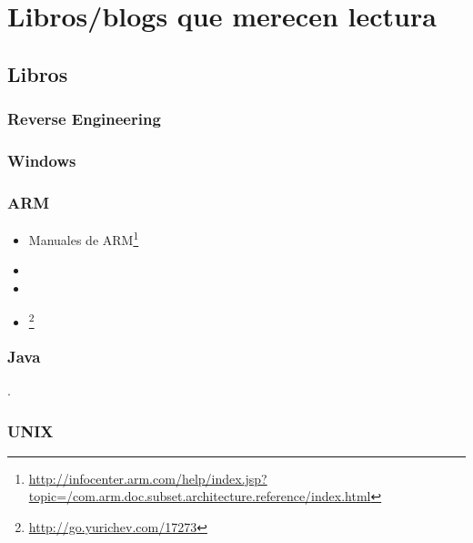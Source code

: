 \part{Libros/blogs que merecen lectura}

\chapter{Libros}

\section{Reverse Engineering}



\section{Windows}



\section{\CCpp}



\section{ARM}

\begin{itemize}
\item Manuales de ARM\footnote{\AlsoAvailableAs \url{http://infocenter.arm.com/help/index.jsp?topic=/com.arm.doc.subset.architecture.reference/index.html}}

\item \ARMSevenRef

\item \ARMSixFourRefURL

\item \ARMCookBook\footnote{\AlsoAvailableAs \url{http://go.yurichev.com/17273}}
\end{itemize}

\section{Java}

\JavaBook.

\section{UNIX}

